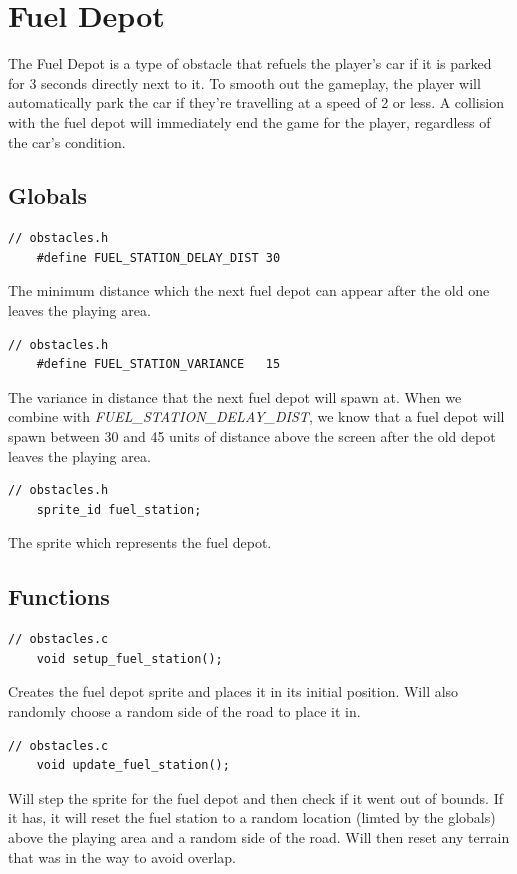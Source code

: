 \documentclass{article}
\begin{document}
\section{Fuel Depot}
The Fuel Depot is a type of obstacle that refuels the player's car if it is parked for 3 seconds directly next to it. To smooth out the gameplay, the player will automatically park the car if they're travelling at a speed of 2 or less. A collision with the fuel depot will immediately end the game for the player, regardless of the car's condition.

\subsection*{Globals}
\begin{lstlisting}[style=CStyle]
	// obstacles.h
	#define FUEL_STATION_DELAY_DIST	30
\end{lstlisting}
The minimum distance which the next fuel depot can appear after the old one leaves the playing area. 
\begin{lstlisting}[style=CStyle]
	// obstacles.h
	#define FUEL_STATION_VARIANCE	15
\end{lstlisting}
The variance in distance that the next fuel depot will spawn at. When we combine with \emph{FUEL\_STATION\_DELAY\_DIST}, we know that a fuel depot will spawn between 30 and 45 units of distance above the screen after the old depot leaves the playing area. 
\begin{lstlisting}[style=CStyle]
	// obstacles.h
	sprite_id fuel_station;
\end{lstlisting}
The sprite which represents the fuel depot.
\newline

\subsection*{Functions}
\begin{lstlisting}[style=CStyle]
	// obstacles.c
	void setup_fuel_station();
\end{lstlisting}
Creates the fuel depot sprite and places it in its initial position. Will also randomly choose a random side of the road to place it in. 
\begin{lstlisting}[style=CStyle]
	// obstacles.c
	void update_fuel_station();
\end{lstlisting}
Will step the sprite for the fuel depot and then check if it went out of bounds. If it has, it will reset the fuel station to a random location (limted by the globals) above the playing area and a random side of the road. Will then reset any terrain that was in the way to avoid overlap. 
\newline
\end{document}
